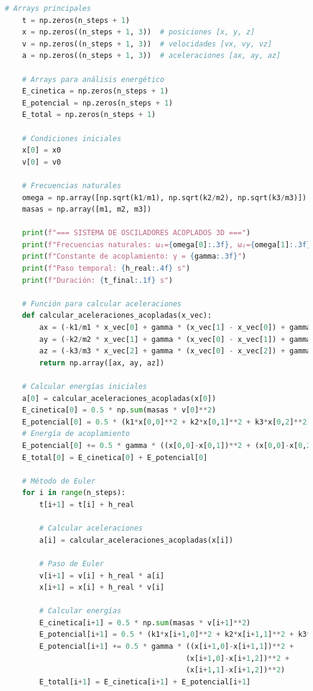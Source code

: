 \documentclass{article}
\begin{document}
\begin{lstlisting}[language=Python, caption={Análisis completo de figuras de Lissajous 3D y osciladores acoplados}]
    # Arrays principales
    t = np.zeros(n_steps + 1)
    x = np.zeros((n_steps + 1, 3))  # posiciones [x, y, z]
    v = np.zeros((n_steps + 1, 3))  # velocidades [vx, vy, vz]
    a = np.zeros((n_steps + 1, 3))  # aceleraciones [ax, ay, az]
    
    # Arrays para análisis energético
    E_cinetica = np.zeros(n_steps + 1)
    E_potencial = np.zeros(n_steps + 1)
    E_total = np.zeros(n_steps + 1)
    
    # Condiciones iniciales
    x[0] = x0
    v[0] = v0
    
    # Frecuencias naturales
    omega = np.array([np.sqrt(k1/m1), np.sqrt(k2/m2), np.sqrt(k3/m3)])
    masas = np.array([m1, m2, m3])
    
    print(f"=== SISTEMA DE OSCILADORES ACOPLADOS 3D ===")
    print(f"Frecuencias naturales: ω₁={omega[0]:.3f}, ω₂={omega[1]:.3f}, ω₃={omega[2]:.3f} rad/s")
    print(f"Constante de acoplamiento: γ = {gamma:.3f}")
    print(f"Paso temporal: {h_real:.4f} s")
    print(f"Duración: {t_final:.1f} s")
    
    # Función para calcular aceleraciones
    def calcular_aceleraciones_acopladas(x_vec):
        ax = (-k1/m1 * x_vec[0] + gamma * (x_vec[1] - x_vec[0]) + gamma * (x_vec[2] - x_vec[0]))
        ay = (-k2/m2 * x_vec[1] + gamma * (x_vec[0] - x_vec[1]) + gamma * (x_vec[2] - x_vec[1]))
        az = (-k3/m3 * x_vec[2] + gamma * (x_vec[0] - x_vec[2]) + gamma * (x_vec[1] - x_vec[2]))
        return np.array([ax, ay, az])
    
    # Calcular energías iniciales
    a[0] = calcular_aceleraciones_acopladas(x[0])
    E_cinetica[0] = 0.5 * np.sum(masas * v[0]**2)
    E_potencial[0] = 0.5 * (k1*x[0,0]**2 + k2*x[0,1]**2 + k3*x[0,2]**2)
    # Energía de acoplamiento
    E_potencial[0] += 0.5 * gamma * ((x[0,0]-x[0,1])**2 + (x[0,0]-x[0,2])**2 + (x[0,1]-x[0,2])**2)
    E_total[0] = E_cinetica[0] + E_potencial[0]
    
    # Método de Euler
    for i in range(n_steps):
        t[i+1] = t[i] + h_real
        
        # Calcular aceleraciones
        a[i] = calcular_aceleraciones_acopladas(x[i])
        
        # Paso de Euler
        v[i+1] = v[i] + h_real * a[i]
        x[i+1] = x[i] + h_real * v[i]
        
        # Calcular energías
        E_cinetica[i+1] = 0.5 * np.sum(masas * v[i+1]**2)
        E_potencial[i+1] = 0.5 * (k1*x[i+1,0]**2 + k2*x[i+1,1]**2 + k3*x[i+1,2]**2)
        E_potencial[i+1] += 0.5 * gamma * ((x[i+1,0]-x[i+1,1])**2 + 
                                          (x[i+1,0]-x[i+1,2])**2 + 
                                          (x[i+1,1]-x[i+1,2])**2)
        E_total[i+1] = E_cinetica[i+1] + E_potencial[i+1]
    

\end{lstlisting}
\end{document}
